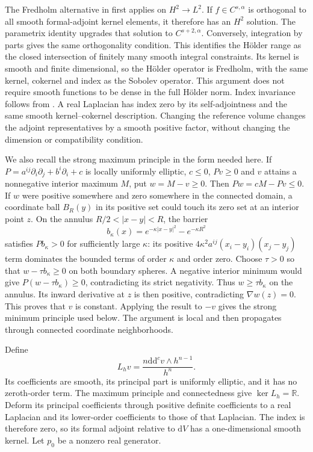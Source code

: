 \documentclass[11pt]{article}
\newcommand{\ddc}{\mathrm{d}\mathrm{d}^c}
\begin{document}
The Fredholm alternative in \cite[Chapter 7, (10.4)--(10.6)]{Taylor7}
first applies on $H^2\to L^2$. If $f\in C^{s,\alpha}$ is orthogonal
to all smooth formal-adjoint kernel elements, it therefore has an
$H^2$ solution. The parametrix identity upgrades that solution to
$C^{s+2,\alpha}$. Conversely, integration by parts gives the same
orthogonality condition. This identifies the H\"older range as the
closed intersection of finitely many smooth integral constraints.
Its kernel is smooth and finite dimensional, so the H\"older operator
is Fredholm, with the same kernel, cokernel and index as the Sobolev
operator. This argument does not require smooth functions to be dense
in the full H\"older norm. Index invariance follows from
\cite[Section 7, Proposition 7.4 and its proof]{TaylorFA}.
A real Laplacian has index zero by its self-adjointness and the same
smooth kernel--cokernel description. Changing the reference volume
changes the adjoint representatives by a smooth positive factor,
without changing the dimension or compatibility condition.

We also recall the strong maximum principle in the form needed here.
If $P=a^{ij}\partial_i\partial_j+b^i\partial_i+c$ is locally uniformly
elliptic, $c\le0$, $Pv\ge0$ and $v$ attains a nonnegative interior
maximum $M$, put $w=M-v\ge0$. Then $Pw=cM-Pv\le0$.
If $w$ were positive somewhere and zero somewhere in the connected
domain, a coordinate ball $B_R(y)$ in its positive set could touch
its zero set at an interior point $z$. On the annulus
$R/2<|x-y|<R$, the barrier
\[
 b_\kappa(x)=e^{-\kappa|x-y|^2}-e^{-\kappa R^2}
\]
satisfies $Pb_\kappa>0$ for sufficiently large $\kappa$: its positive
$4\kappa^2a^{ij}(x_i-y_i)(x_j-y_j)$ term dominates the bounded
terms of order $\kappa$ and order zero. Choose $\tau>0$ so that
$w-\tau b_\kappa\ge0$ on both boundary spheres. A negative interior
minimum would give $P(w-\tau b_\kappa)\ge0$, contradicting its strict
negativity. Thus $w\ge\tau b_\kappa$ on the annulus. Its inward
derivative at $z$ is then positive, contradicting $\nabla w(z)=0$.
This proves that $v$ is constant. Applying the result to $-v$ gives
the strong minimum principle used below. The argument is local and
then propagates through connected coordinate neighborhoods.

Define
\[
 L_hv=\frac{n\ddc v\wedge h^{n-1}}{h^n}.
\]
Its coefficients are smooth, its principal part is uniformly elliptic,
and it has no zeroth-order term. The maximum principle and connectedness
give $\ker L_h=\mathbb R$. Deform its principal coefficients through
positive definite coefficients to a real Laplacian and its lower-order
coefficients to those of that Laplacian. The index is therefore zero,
so its formal adjoint relative to $\mathrm dV$ has a one-dimensional
smooth kernel. Let $p_0$ be a nonzero real generator.
\end{document}
